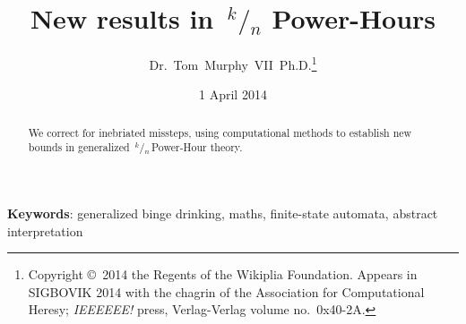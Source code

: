 \documentclass[twocolumn]{article}
\newcommand\sfrac[2]{\!{}\,^{#1}\!/{}\!_{#2}}
\begin{document}
 

\title{New results in $\sfrac{k}{n}$ Power-Hours}
\author{Dr.~Tom~Murphy~VII~Ph.D.\thanks{
Copyright \copyright\ 2014 the Regents of the Wikiplia
Foundation. Appears in SIGBOVIK 2014 with the chagrin of the
Association for Computational Heresy; {\em IEEEEEE!} press,
Verlag-Verlag volume no.~0x40-2A.
}
}

\renewcommand\th{\ensuremath{{}^{\textrm{th}}}}
\newcommand\st{\ensuremath{{}^{\textrm{st}}}}
\newcommand\rd{\ensuremath{{}^{\textrm{rd}}}}
\newcommand\nd{\ensuremath{{}^{\textrm{nd}}}}
\newcommand\at{\ensuremath{\scriptstyle @}}

\renewcommand\>{$>$}
\newcommand\<{$<$}
\newcommand\kn{\ensuremath{\sfrac{k}{n}\,}}
\newcommand\bmsl{BM$s$L}

\newcommand\any{\ensuremath{\textrm{?}}}
\newcommand\nocup{\text{\sout{\ensuremath{\cup}}}}
\newcommand\fullcup{\ensuremath{\uplus}}
\newcommand\emptycup{\ensuremath{\cup}}
\newcommand\overcup{\ensuremath{\cap}}
\newcommand\scup[1]{\ensuremath{\cup\!\!\!{}^{{}_{#1}}}}

\newcommand\nodrink{\ensuremath{\Rightarrow}}
\newcommand\drink{\ensuremath{\stackrel{{}^{\textrm{+}}}{\Rightarrow}}}
\newcommand\qdrink{\ensuremath{\stackrel{{}^{\textrm{?}}}{\Rightarrow}}}

\date{1 April 2014}

\maketitle \thispagestyle{empty}

\begin{abstract}
We correct for inebriated missteps, using computational methods to
establish new bounds in generalized \kn Power-Hour theory.
\end{abstract}

\vspace{1em}
{\noindent \small {\bf Keywords}:
  generalized binge drinking, maths,
  finite-state automata,
  abstract interpretation
}
\end{document}
